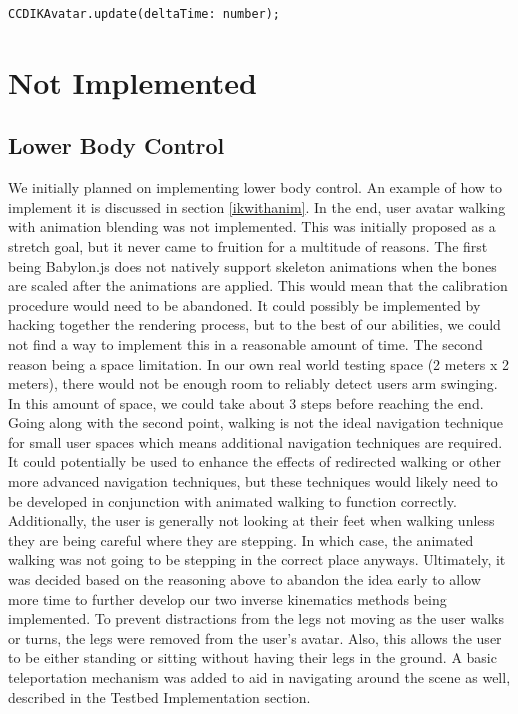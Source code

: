 \documentclass{vgtc}                          %
\begin{document}
\begin{verbatim}
CCDIKAvatar.update(deltaTime: number);
\end{verbatim}

\section{Not Implemented}

\subsection{Lower Body Control}

    We initially planned on implementing lower body control. An example of how to implement it is discussed in section \ref{ikwithanim}. In the end, user avatar walking with animation blending was not implemented. This was initially proposed as a stretch goal, but it never came to fruition for a multitude of reasons. The first being Babylon.js does not natively support skeleton animations when the bones are scaled after the animations are applied. This would mean that the calibration procedure would need to be abandoned. It could possibly be implemented by hacking together the rendering process, but to the best of our abilities, we could not find a way to implement this in a reasonable amount of time. The second reason being a space limitation. In our own real world testing space (2 meters x 2 meters), there would not be enough room to reliably detect users arm swinging. In this amount of space, we could take about 3 steps before reaching the end. Going along with the second point, walking is not the ideal navigation technique for small user spaces which means additional navigation techniques are required. It could potentially be used to enhance the effects of redirected walking or other more advanced navigation techniques, but these techniques would likely need to be developed in conjunction with animated walking to function correctly. Additionally, the user is generally not looking at their feet when walking unless they are being careful where they are stepping. In which case, the animated walking was not going to be stepping in the correct place anyways. Ultimately, it was decided based on the reasoning above to abandon the idea early to allow more time to further develop our two inverse kinematics methods being implemented. To prevent distractions from the legs not moving as the user walks or turns, the legs were removed from the user’s avatar. Also, this allows the user to be either standing or sitting without having their legs in the ground. A basic teleportation mechanism was added to aid in navigating around the scene as well, described in the Testbed Implementation section. 
\end{document}
